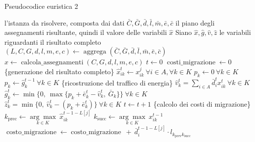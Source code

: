 \begin{algorithm}
    \caption{Pseudocodice euristica 2}
    \label{alg:euristica-modello}
    \begin{algorithmic}[1]
        \Require l'istanza da risolvere, composta dai dati $\bar{C}, \bar{G}, \bar{d}, \bar{l}, \bar{m}, \bar{e}, \bar{c}$
        \Ensure il piano degli assegnamenti risultante, quindi il valore delle variabili $\hat{x}$
        \State Siano $\hat{x}, \hat{g}, \hat{v}, \hat{z}$ le variabili riguardanti il risultato completo
        \State $(L, C, G, d, l, m, e, c) \gets \operatorname{aggrega}(\bar{C}, \bar{G}, \bar{d}, \bar{l}, \bar{m}, \bar{e}, \bar{c})$ \label{algo1:l:aggrega}
        \State $x \gets \operatorname{calcola\_assegnamenti}(C, G, d, l, m, e, c)$
        \State $t \gets 0$
        \State $\operatorname{costi\_migrazione} \gets 0$
        \State \{generazione del risultato completo\}
                \State $\hat{x}^t_{ik} \gets x^j_{ik} ~ \forall i \in A, \forall k \in K$
                    \State $p_k \gets 0 ~ \forall k \in K$
                \Else
                    \State $p_k \gets \hat{g}^{t-1}_k ~ \forall k \in K$
                \EndIf
                \State \{ricostruzione del traffico di energia\}
                \State $\hat{v}^t_k = \sum_{i \in A} \bar{d}^t_i x^t_{ik} ~ \forall k \in K$
                \State $\hat{g}^t_k \gets \min\{0, ~ \max\{p_k + \bar{e}^t_k- \hat{v}^t_k, ~ \bar{G}_k\}\} ~ \forall k \in K$
                \State $\hat{z}^t_k = \min\{0, ~ \hat{v}^t_k - \left(p_k + \bar{e}^t_k\right)\} ~ \forall k \in K$
                \State $t \gets t + 1$
            \EndFor
            \State \{calcolo dei costi di migrazione\}
                \State $k_{\operatorname{prec}} \gets \underset{k \in K}{\arg\max} ~ \hat{x}^{t-1-L[j]}_{ik}$
                \State $k_{\operatorname{succ}} \gets \underset{k \in K}{\arg\max} ~ x^{t-1}_{ik}$
                    \State $\operatorname{costo\_migrazione} \gets \operatorname{costo\_migrazione} ~ + ~ \bar{d}^{t-1-L[j]}_i \cdot l_{k_{\operatorname{prev}} k_{\operatorname{succ}}}$
                \EndIf
            \EndFor
            \EndIf
        \EndFor
    \end{algorithmic}
\end{algorithm}
